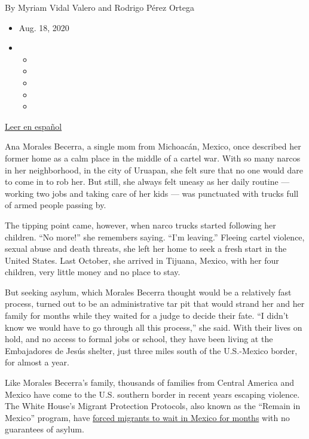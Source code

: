 By Myriam Vidal Valero and Rodrigo Pérez Ortega

\begin{itemize}
\item
  Aug. 18, 2020
\item
  \begin{itemize}
  \item
  \item
  \item
  \item
  \item
  \end{itemize}
\end{itemize}

\href{https://www.nytimes3xbfgragh.onion/es/2020/08/18/espanol/america-latina/escuela-frontera-mexico.html}{Leer
en español}

Ana Morales Becerra, a single mom from Michoacán, Mexico, once described
her former home as a calm place in the middle of a cartel war. With so
many narcos in her neighborhood, in the city of Uruapan, she felt sure
that no one would dare to come in to rob her. But still, she always felt
uneasy as her daily routine --- working two jobs and taking care of her
kids --- was punctuated with trucks full of armed people passing by.

The tipping point came, however, when narco trucks started following her
children. ``No more!'' she remembers saying. ``I'm leaving.'' Fleeing
cartel violence, sexual abuse and death threats, she left her home to
seek a fresh start in the United States. Last October, she arrived in
Tijuana, Mexico, with her four children, very little money and no place
to stay.

But seeking asylum, which Morales Becerra thought would be a relatively
fast process, turned out to be an administrative tar pit that would
strand her and her family for months while they waited for a judge to
decide their fate. ``I didn't know we would have to go through all this
process,'' she said. With their lives on hold, and no access to formal
jobs or school, they have been living at the Embajadores de Jesús
shelter, just three miles south of the U.S.-Mexico border, for almost a
year.

Like Morales Becerra's family, thousands of families from Central
America and Mexico have come to the U.S. southern border in recent years
escaping violence. The White House's Migrant Protection Protocols, also
known as the ``Remain in Mexico'' program, have
\href{https://www.nytimes3xbfgragh.onion/interactive/2019/08/18/us/mexico-immigration-asylum.html}{forced
migrants to wait in Mexico for months} with no guarantees of asylum.

